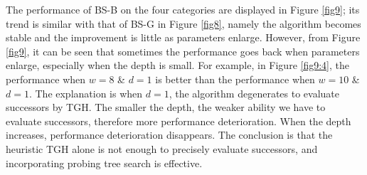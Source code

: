 \documentclass[review,3p,times,authoryear,12pt]{elsarticle}
\begin{document}
The performance of BS-B on the four categories are displayed in Figure \ref{fig9}; its trend is similar with that of BS-G in Figure \ref{fig8}, namely the algorithm becomes stable and the improvement is little as parameters enlarge. However, from Figure \ref{fig9}, it can be seen that sometimes the performance goes back when parameters enlarge, especially when the depth is small. For example, in Figure \ref{fig9:4}, the performance when $w=8$ \& $d=1$ is better than the performance when $w=10$ \& $d=1$. The explanation is when $d=1$, the algorithm degenerates to evaluate successors by TGH. The smaller the depth, the weaker ability we have to evaluate successors, therefore more performance deterioration. When the depth increases, performance deterioration disappears. The conclusion is that the heuristic TGH alone is not enough to precisely evaluate successors, and incorporating probing tree search is effective.
\end{document}
